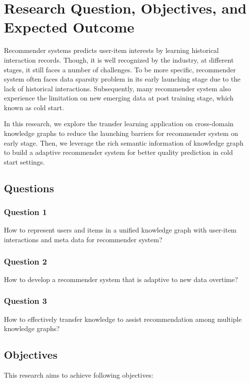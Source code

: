 
\section{Research Question, Objectives, and Expected Outcome}

Recommender systems predicts user-item interests by learning historical interaction records. Though, it is well recognized by the industry, at different stages, it still faces a number of challenges. 
To be more specific, recommender system often faces data sparsity problem in its early launching stage due to the lack of historical interactions. 
Subsequently, many recommender system also experience the limitation on new emerging data at post training stage, which known as cold start. 

In this research, we explore the transfer learning application on cross-domain knowledge graphs to reduce the launching barriers for recommender system on early stage. Then, we leverage the rich semantic information of knowledge graph to build a adaptive recommender system for better quality prediction in cold start settings. 

\subsection{Questions}

\subsubsection*{Question 1}
How to represent users and items in a unified knowledge graph with user-item interactions and meta data for recommender system?

\subsubsection*{Question 2}
How to develop a recommender system that is adaptive to new data overtime?

\subsubsection*{Question 3}
How to effectively transfer knowledge to assist recommendation among multiple knowledge graphs?

\subsection{Objectives}
This research aims to achieve following objectives: 

